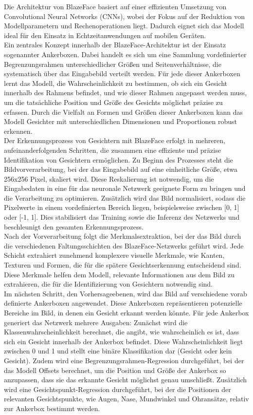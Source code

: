 Die Architektur von BlazeFace basiert auf einer effizienten Umsetzung von Convolutional Neural Networks (CNNs), wobei der Fokus auf der Reduktion von Modellparametern und Rechenoperationen liegt. Dadurch eignet sich das Modell ideal für den Einsatz in Echtzeitanwendungen auf mobilen Geräten. \\
Ein zentrales Konzept innerhalb der BlazeFace-Architektur ist der Einsatz sogenannter Ankerboxen. Dabei handelt es sich um eine Sammlung vordefinierter Begrenzungsrahmen unterschiedlicher Größen und Seitenverhältnisse, die systematisch über das Eingabebild verteilt werden. Für jede dieser Ankerboxen lernt das Modell, die Wahrscheinlichkeit zu bestimmen, ob sich ein Gesicht innerhalb des Rahmens befindet, und wie dieser Rahmen angepasst werden muss, um die tatsächliche Position und Größe des Gesichts möglichst präzise zu erfassen. Durch die Vielfalt an Formen und Größen dieser Ankerboxen kann das Modell Gesichter mit unterschiedlichen Dimensionen und Proportionen robust erkennen. \\
Der Erkennungsprozess von Gesichtern mit BlazeFace erfolgt in mehreren, aufeinanderfolgenden Schritten, die zusammen eine effiziente und präzise Identifikation von Gesichtern ermöglichen. Zu Beginn des Prozesses steht die Bildvorverarbeitung, bei der das Eingabebild auf eine einheitliche Größe, etwa 256x256 Pixel, skaliert wird. Diese Reskalierung ist notwendig, um die Eingabedaten in eine für das neuronale Netzwerk geeignete Form zu bringen und die Verarbeitung zu optimieren. Zusätzlich wird das Bild normalisiert, sodass die Pixelwerte in einem vordefinierten Bereich liegen, beispielsweise zwischen [0, 1] oder [-1, 1]. Dies stabilisiert das Training sowie die Inferenz des Netzwerks und beschleunigt den gesamten Erkennungsprozess. \\
Nach der Vorverarbeitung folgt die Merkmalsextraktion, bei der das Bild durch die verschiedenen Faltungsschichten des BlazeFace-Netzwerks geführt wird. Jede Schicht extrahiert zunehmend komplexere visuelle Merkmale, wie Kanten, Texturen und Formen, die für die spätere Gesichtserkennung entscheidend sind. Diese Merkmale helfen dem Modell, relevante Informationen aus dem Bild zu extrahieren, die für die Identifizierung von Gesichtern notwendig sind. \\ 
Im nächsten Schritt, den Vorhersageebenen, wird das Bild auf verschiedene vorab definierte Ankerboxen angewendet. Diese Ankerboxen repräsentieren potenzielle Bereiche im Bild, in denen ein Gesicht erkannt werden könnte. Für jede Ankerbox generiert das Netzwerk mehrere Ausgaben: Zunächst wird die Klassenwahrscheinlichkeit berechnet, die angibt, wie wahrscheinlich es ist, dass sich ein Gesicht innerhalb der Ankerbox befindet. Diese Wahrscheinlichkeit liegt zwischen 0 und 1 und stellt eine binäre Klassifikation dar (Gesicht oder kein Gesicht). Zudem wird eine Begrenzungsrahmen-Regression durchgeführt, bei der das Modell Offsets berechnet, um die Position und Größe der Ankerbox so anzupassen, dass sie das erkannte Gesicht möglichst genau umschließt. Zusätzlich wird eine Gesichtspunkt-Regression durchgeführt, bei der die Positionen der relevanten Gesichtspunkte, wie Augen, Nase, Mundwinkel und Ohransätze, relativ zur Ankerbox bestimmt werden. \\
